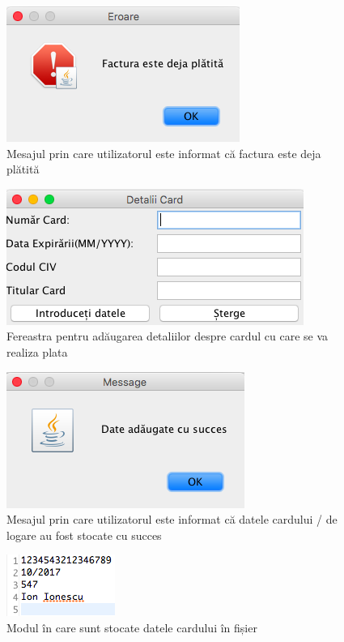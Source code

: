 \documentclass[12pt]{book}
\begin{document}
\begin{figure}[!ht]
	\centering
	\includegraphics{FacturaPlatita}
	\caption{Mesajul prin care utilizatorul este informat că factura este deja plătită}
\end{figure}

\begin{figure}[!ht]
	\centering
	\includegraphics{DetaliiCard}
	\caption{Fereastra pentru adăugarea detaliilor despre cardul cu care se va realiza plata}
\end{figure}

\begin{figure}[!ht]
	\centering
	\includegraphics{DateCardSucces}
	\caption{Mesajul prin care utilizatorul este informat că datele cardului / de logare au fost stocate cu succes}
\end{figure}

\begin{figure}[!ht]
	\centering
	\includegraphics{DetaliiCardDocument}
	\caption{Modul în care sunt stocate datele cardului în fișier}
\end{figure}
\end{document}
